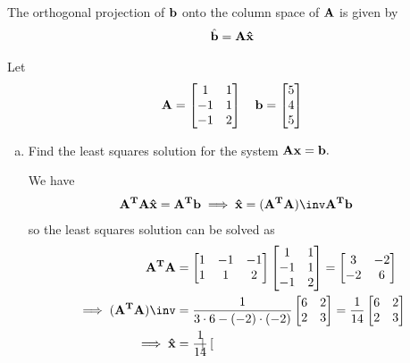 \documentclass{article}
\begin{document}
\begin{enumerate}
\begin{itemize}
				\ii The orthogonal projection of $\bf b$ onto the column space of $\bf A$ is given by
				\begin{align*}
					\hat{\bf b} = \bf{A\hat x}
				\end{align*}
		\end{itemize}
		Let
		\begin{align*}
			\bf A = \begin{bmatrix}
				1 & 1 \\ -1 & 1 \\ -1 & 2
			\end{bmatrix} \quad \bf b = \begin{bmatrix}
				5 \\ 4 \\ 5
			\end{bmatrix}
		\end{align*}
		\begin{enumerate}[(a)]
			\item Find the least squares solution for the system $\bf{Ax}=\bf b.$
				\begin{soln}
					We have
					\begin{align*}
						\bf{A^T A\hat x} &= \bf{A^T b}\implies \bf{\hat x} = (\bf{A^T A})\inv \bf{A^T b} 
					\end{align*}
					so the least squares solution can be solved as
					\begin{align*}
						\bf{A^T A} &= \begin{bmatrix}
							1 & -1 & -1 \\ 1 & 1 & 2
						\end{bmatrix} \begin{bmatrix}
							1 & 1 \\ -1 & 1 \\ -1 & 2
						\end{bmatrix} = \begin{bmatrix}
							3 & -2 \\ -2 & 6
						\end{bmatrix} \\
						\implies (\bf{A^T A})\inv &= \frac{1}{3\cdot 6 - (-2)\cdot (-2)} \begin{bmatrix}
							6 & 2 \\ 2 & 3
						\end{bmatrix} = \frac{1}{14} \begin{bmatrix}
							6 & 2 \\ 2 & 3
						\end{bmatrix} \\
						\implies \bf{\hat x} &= \frac{1}{14}\begin{bmatrix}

\end{bmatrix}
\end{align*}
\end{soln}
\end{enumerate}
\end{enumerate}
\end{document}
